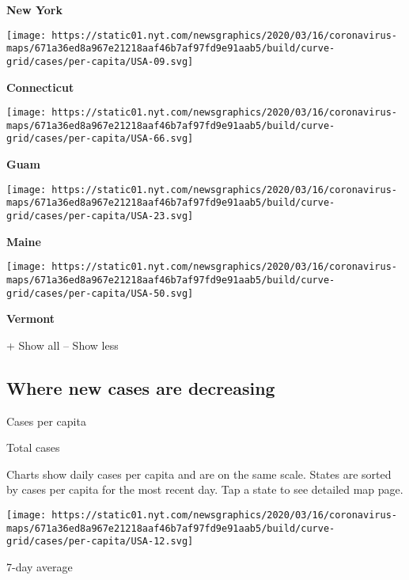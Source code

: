\textbf{New York}

\href{https://www.nytimes.com/interactive/2020/us/connecticut-coronavirus-cases.html}{}

\texttt{[image: https://static01.nyt.com/newsgraphics/2020/03/16/coronavirus-maps/671a36ed8a967e21218aaf46b7af97fd9e91aab5/build/curve-grid/cases/per-capita/USA-09.svg]}

\textbf{Connecticut}

\texttt{[image: https://static01.nyt.com/newsgraphics/2020/03/16/coronavirus-maps/671a36ed8a967e21218aaf46b7af97fd9e91aab5/build/curve-grid/cases/per-capita/USA-66.svg]}

\textbf{Guam}

\href{https://www.nytimes.com/interactive/2020/us/maine-coronavirus-cases.html}{}

\texttt{[image: https://static01.nyt.com/newsgraphics/2020/03/16/coronavirus-maps/671a36ed8a967e21218aaf46b7af97fd9e91aab5/build/curve-grid/cases/per-capita/USA-23.svg]}

\textbf{Maine}

\href{https://www.nytimes.com/interactive/2020/us/vermont-coronavirus-cases.html}{}

\texttt{[image: https://static01.nyt.com/newsgraphics/2020/03/16/coronavirus-maps/671a36ed8a967e21218aaf46b7af97fd9e91aab5/build/curve-grid/cases/per-capita/USA-50.svg]}

\textbf{Vermont}

+ Show all -- Show less

\hypertarget{where-new-cases-are-decreasing}{%
\subsection{Where new cases are
decreasing}\label{where-new-cases-are-decreasing}}

Cases per capita

Total cases

Charts show daily cases per capita and are on the same scale. States are
sorted by cases per capita for the most recent day. Tap a state to see
detailed map page.

\href{https://www.nytimes.com/interactive/2020/us/florida-coronavirus-cases.html}{}

\texttt{[image: https://static01.nyt.com/newsgraphics/2020/03/16/coronavirus-maps/671a36ed8a967e21218aaf46b7af97fd9e91aab5/build/curve-grid/cases/per-capita/USA-12.svg]}

7-day average

